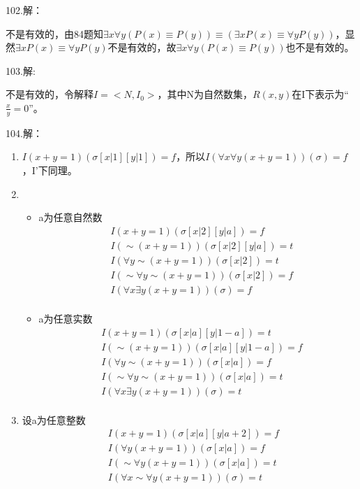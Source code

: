 \documentclass[a4paper]{ctexart}
\begin{document}
\noindent 102.解：

不是有效的，由84题知$\exists{x}\forall{y}(P(x)\equiv P(y))\equiv (\exists{x}P(x)\equiv\forall{y}P(y))$，显然$\exists{x}P(x)\equiv\forall{y}P(y)$不是有效的，故$\exists{x}\forall{y}(P(x)\equiv P(y))$也不是有效的。\newline

\noindent 103.解:

不是有效的，令解释$I=<N,I_0>$，其中N为自然数集，$R(x,y)$在I下表示为“$\frac{x}{y}=0$”。\newline

\noindent 104.解：
\begin{enumerate}
  \item $I(x+y=1)(\sigma[x|1][y|1])=f$，所以$I(\forall{x}\forall{y}(x+y=1))(\sigma)=f$，I'下同理。
  \item
  \begin{itemize}
    \item a为任意自然数
    \begin{align*}
      &I(x+y=1)(\sigma[x|2][y|a])=f\\
      &I(\sim (x+y=1))(\sigma[x|2][y|a])=t\\
      &I(\forall{y}\sim (x+y=1))(\sigma[x|2])=t\\
      &I(\sim\forall{y}\sim (x+y=1))(\sigma[x|2])=f\\
      &I(\forall{x}\exists{y} (x+y=1))(\sigma)=f\\
    \end{align*}
    \item a为任意实数
    \begin{align*}
      &I(x+y=1)(\sigma[x|a][y|1-a])=t\\
      &I(\sim(x+y=1))(\sigma[x|a][y|1-a])=f\\
      &I(\forall{y}\sim(x+y=1))(\sigma[x|a])=f\\
      &I(\sim\forall{y}\sim (x+y=1))(\sigma[x|a])=t\\
      &I(\forall{x}\exists{y} (x+y=1))(\sigma)=t\\
    \end{align*}
  \end{itemize}
  \item 设a为任意整数
  \begin{align*}
    &I(x+y=1)(\sigma[x|a][y|a+2])=f\\
    &I(\forall{y}(x+y=1))(\sigma[x|a])=f\\
    &I(\sim\forall{y}(x+y=1))(\sigma[x|a])=t\\
    &I(\forall{x}\sim\forall{y}(x+y=1))(\sigma)=t\\

\end{align*}
\end{enumerate}
\end{document}
